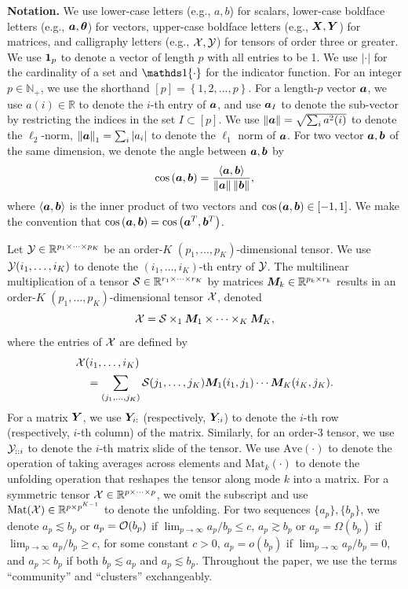 \documentclass[journal]{IEEEtran}
\theoremstyle{definition}
\theoremstyle{definition}
\newcommand{\of}[1]{\left(#1\right)}
\newcommand{\offf}[1]{\left\{#1\right\}}
\newcommand{\ang}[1]{\left\langle#1\right\rangle}
\begin{document}
{\bf Notation.} We use lower-case letters (e.g., $a,b$) for scalars, lower-case boldface letters (e.g., $\bm{a},\boldsymbol{\theta}$) for vectors, upper-case boldface letters (e.g., $\bm X,\bm Y$) for matrices, and calligraphy letters (e.g., $\mathcal{X},\mathcal{Y}$) for tensors of order three or greater. We use $\mathbf{1}_p$ to denote a vector of length $p$ with all entries to be 1. We use $|\cdot|$ for the cardinality of a set and $\ind\{\cdot\}$ for the indicator function. For an integer $p\in\mathbb{N}_{+}$, we use the shorthand $[p]= \offf{1,2,...,p}$. For a length-$p$ vector $\bm{a}$, we use $a(i)\in\mathbb{R}$ to denote the $i$-th entry of $\bm{a}$, and use $\bm{a}_{I}$ to denote the sub-vector by restricting the indices in the set $I\subset [p]$.  We use  $\left\lVert\bm{a}\right\rVert=\sqrt{\sum_{i}a^2(i)}$ to denote the $\ell_2$-norm, $\left\lVert\bm{a}\right\rVert_1=\sum_i |a_i|$ to denote the $\ell_1$ norm of $\bm{a}$. For two vector $\bm{a}, \bm{b}$ of the same dimension, we denote the angle between $\bm{a}, \bm{b}$ by 
\begin{equation}
    \cos \of{\ma, \mb} = \frac{\ang{ \ma, \mb}}{ \onorm{\ma} \onorm{\mb} },
\end{equation}
where $\ang{\ma,\mb}$ is the inner product of two vectors and $\cos \of{\ma, \mb} \in [-1,1]$. We make the convention that $\cos \of{\ma, \mb} = \cos \of{\ma^T, \mb^T}$. 

Let $\mathcal{Y}  \in \mathbb{R}^{p_1 \times \cdots \times p_K}$ be an order-$K$ $(p_1,...,p_K)$-dimensional tensor. We use $\mathcal{Y}(i_1,\ldots,i_K)$ to denote the $(i_1,\ldots,i_K)$-th entry of $\mathcal{Y}$. The multilinear multiplication of a tensor $\mathcal{S}\in \mathbb{R}^{r_1\times \cdots \times r_K}$ by matrices $\bm M_k \in\mathbb{R}^{p_k\times r_k}$ results in an order-$K$ $(p_1,\ldots,p_K)$-dimensional tensor $\mathcal{X}$, denoted
\[
\mathcal{X}=\mathcal{S} \times_1 \bm M_1 \times \cdots \times_K \bm M_K,
\]
where the entries of $\mathcal{X}$ are defined by
\small
\begin{align}
    &\mathcal{X}(i_1,\ldots, i_K) \\
    & \quad =\sum_{(j_1,\ldots,j_K)}\mathcal{S}(j_1,\ldots,j_K)\bm M_1(i_1,j_1)\cdots \bm M_K(i_K,j_K).
\end{align} 
\normalsize
For a matrix $\bm Y$, we use $\bm Y_{i:}$ (respectively, $\bm Y_{:i}$) to denote the $i$-th row (respectively, $i$-th column) of the matrix. Similarly, for an order-3 tensor, we use $\mathcal{Y}_{::i}$ to denote the $i$-th matrix slide of the tensor. We use $\text{Ave}(\cdot)$ to denote the operation of taking averages across elements and $\text{Mat}_k(\cdot)$ to denote the unfolding operation that reshapes the tensor along mode $k$ into a matrix.   {For a symmetric tensor $\mathcal{X} \in\mathbb{R}^{p\times \cdots \times p}$, we omit the subscript and use $\text{Mat}(\mathcal{X})\in\mathbb{R}^{p\times p^{K-1}}$ to denote the unfolding.}  For two sequences $\{a_p\}, \{b_p\}$, we denote $a_p\lesssim b_p$ or $a_p=\mathcal{O}(b_p)$ if $\lim_{p\to\infty}a_p /b_p\leq c${, $a_p \gtrsim b_p$ or $a_p = \Omega(b_p)$ if $\lim_{p\to\infty}a_p /b_p\geq c$, for some constant $c > 0$,}  $a_p=o(b_p)$ if $\lim_{p\to\infty}a_p/b_p =0$, and $a_p \asymp b_p$ if both $b_p \lesssim a_p$ and $a_p\lesssim b_p$. Throughout the paper, we use the terms ``community'' and ``clusters'' exchangeably. 
\end{document}
